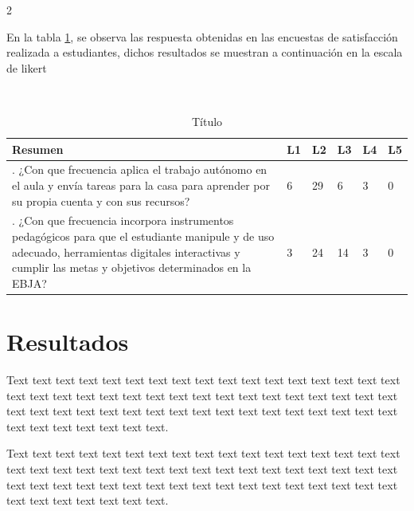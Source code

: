 \documentclass[12pt,twoside]{apa7}
\begin{document}
\begin{multicols}{2}



En la tabla \ref{tab1a}, se observa las respuesta obtenidas en las encuestas de satisfacción realizada a estudiantes, dichos resultados se muestran a continuación en la escala de likert

\begin{table}[ht!]
\setlength\tabcolsep{3pt}
\caption{Título}
\label{tab1a}
\hfill{} \\
\begin{tabularx}{\linewidth}{@{}>{\RaggedRight}X*{5}{l}@{}} 
\textbf{Resumen} & \textbf{L1} & \textbf{L2} & \textbf{L3} & \textbf{L4} & \textbf{L5} \\
\toprule
22. ¿Con que frecuencia aplica el trabajo autónomo en el aula y envía tareas para la casa para aprender por su propia cuenta y con sus recursos?  & 6 & 29 & 6 & 3 & 0 \\
23. ¿Con que frecuencia incorpora instrumentos pedagógicos para que el estudiante manipule y de uso adecuado, herramientas digitales interactivas y cumplir las metas y objetivos determinados en la EBJA? & 3 & 24 & 14 & 3 & 0 \\

\bottomrule
\end{tabularx}
\end{table}





\section{Resultados}

Text text text text text text text text text text text text text text text text text text text text text text text text text text text text text text text text text text text text text text text text text text text text text text text text text text text text text text text text text text.

Text text text text text text text text text text text text text text text text text text text text text text text text text text text text text text text text text text text text text text text text text text text text text text text text text text text text text text text text text text.


\end{multicols}
\end{document}
